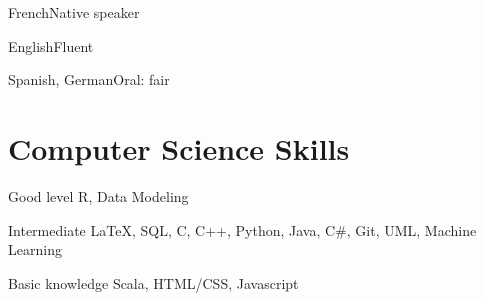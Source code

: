 \documentclass{tccv}
\begin{document}
\begin{factlist}
\item{French}{Native speaker}
\item{English}{Fluent}
\item{Spanish, German}{Oral: fair}
\end{factlist}

\section{Computer Science Skills}

\begin{factlist}

\item{Good level}
     {R, Data Modeling}

\item{Intermediate}
     {\LaTeX, SQL, C, C++, Python, Java, C\#, Git, UML, Machine Learning}

\item{Basic knowledge}
     {Scala, HTML/CSS, Javascript}

\end{factlist}
\end{document}
